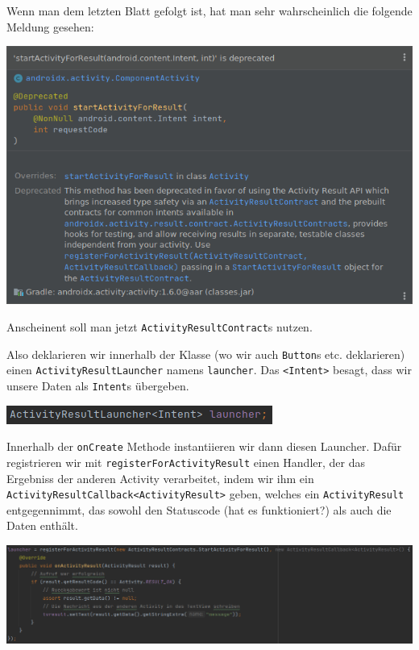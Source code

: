 \documentclass[8pt, letterpaper]{article}
\begin{document}

Wenn man dem letzten Blatt gefolgt ist, hat man sehr wahrscheinlich die folgende Meldung gesehen:

\begin{center}
  \includegraphics{deprecated}
\end{center}

Anscheinent soll man jetzt \texttt{ActivityResultContract}s nutzen.

Also deklarieren wir innerhalb der Klasse (wo wir auch \texttt{Button}s etc. deklarieren) einen \texttt{ActivityResultLauncher} namens \texttt{launcher}. Das \texttt{<Intent>} besagt, dass wir unsere Daten als \texttt{Intent}s übergeben.

\begin{center}
  \includegraphics{declare}
\end{center}

Innerhalb der \texttt{onCreate} Methode instantiieren wir dann diesen Launcher. Dafür registrieren wir mit \texttt{registerForActivityResult} einen Handler, der das Ergebniss der anderen Activity verarbeitet, indem wir ihm ein \texttt{ActivityResultCallback<ActivityResult>} geben, welches ein \texttt{ActivityResult} entgegennimmt, das sowohl den Statuscode (hat es funktioniert?) als auch die Daten enthält.

\begin{center}
  \includegraphics[width=18cm]{instanciate}
\end{center}
\end{document}
